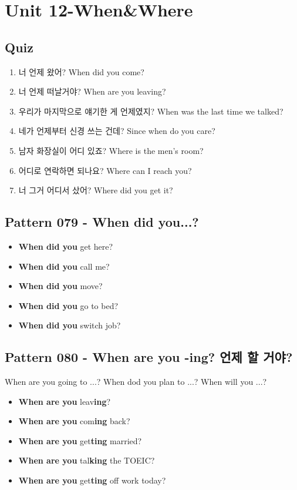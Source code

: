 \documentclass[11pt]{oblivoir}
\begin{document}
\section{Unit 12-When\&Where}
\subsection{Quiz}
\begin{enumerate}
  \color{black} \item 너 언제 왔어?
    \color{light-gray} When did you come?
  \color{red} \item 너 언제 떠날거야?
    \color{light-gray} When are you leaving?
  \color{red} \item 우리가 마지막으로 얘기한 게 언제였지?
    \color{light-gray} When was the last time we talked?
  \color{red} \item 네가 언제부터 신경 쓰는 건데?
    \color{light-gray} Since when do you care?
  \color{black} \item 남자 화장실이 어디 있죠?
    \color{light-gray} Where is the men's room?
  \color{red} \item 어디로 연락하면 되나요?
    \color{light-gray} Where can I reach you?
   \color{black} \item 너 그거 어디서 샀어?
    \color{light-gray} Where did you get it?
\end{enumerate}

\subsection{Pattern 079 - When did you...?}
\begin{itemize}
  \item \textbf{When did you} get here?
  \item \textbf{When did you} call me?
  \item \textbf{When did you} move?
  \item \textbf{When did you} go to bed?
  \item \textbf{When did you} switch job?
\end{itemize}

\subsection{Pattern 080 - When are you -ing? 언제 \texttildelow 할 거야?}
When are you going to ...? 
When dod you plan to ...?
When will you ...?

\begin{itemize}
  \item \textbf{When are you} leav\textbf{ing}?
  \item \textbf{When are you} com\textbf{ing} back?
  \item \textbf{When are you} get\textbf{ting} married?
  \item \textbf{When are you} tal\textbf{king} the TOEIC?
  \item \textbf{When are you} get\textbf{ting} off work today?
\end{itemize}
\end{document}
